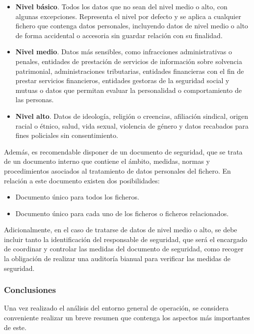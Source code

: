 \begin{itemize}
    \item \textbf{Nivel básico}. Todos los datos que no sean del nivel medio o alto, con algunas excepciones. Representa el nivel por defecto y se aplica a cualquier fichero que contenga datos personales, incluyendo datos de nivel medio o alto de forma accidental o accesoria sin guardar relación con su finalidad.
    
    \item \textbf{Nivel medio}. Datos más sensibles, como infracciones administrativas o penales, entidades de prestación de servicios de información sobre solvencia patrimonial, administraciones tributarias, entidades financieras con el fin de prestar servicios financieros, entidades gestoras de la seguridad social y mutuas o datos que permitan evaluar la personalidad o comportamiento de las personas.
    
    \item \textbf{Nivel alto}. Datos de ideología, religión o creencias, afiliación sindical, origen racial o étnico, salud, vida sexual, violencia de género y datos recabados para fines policiales sin consentimiento.
\end{itemize}

Además, es recomendable disponer de un documento de seguridad, que se trata de un documento interno que contiene el ámbito, medidas, normas y procedimientos asociados al tratamiento de datos personales del fichero. En relación a este documento existen dos posibilidades:

\begin{itemize}
    \item Documento único para todos los ficheros.
    \item Documento único para cada uno de los ficheros o ficheros relacionados.
\end{itemize}

Adicionalmente, en el caso de tratarse de datos de nivel medio o alto, se debe incluir tanto la identificación del responsable de seguridad, que será el encargado de coordinar y controlar las medidas del documento de seguridad, como recoger la obligación de realizar una auditoría bianual para verificar las medidas de seguridad.

\clearpage

\subsubsection{Conclusiones}
Una vez realizado el análisis del entorno general de operación, se considera conveniente realizar un breve resumen que contenga los aspectos más importantes de este.

